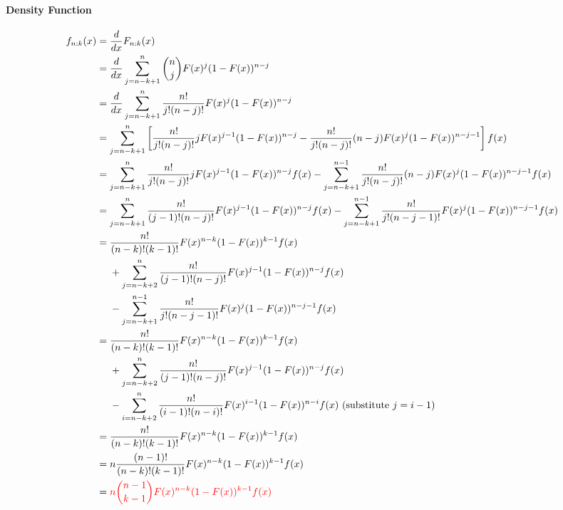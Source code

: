 \documentclass{article}
\begin{document}
	\paragraph{Density Function}
	\begin{align}
		f_{n:k}(x)
		&= \frac{d}{dx} F_{n:k}(x) \\
		&= \frac{d}{dx} \sum_{j=n-k+1}^n \binom{n}{j} F(x)^j (1 - F(x))^{n-j} \\
		&= \frac{d}{dx} \sum_{j=n-k+1}^n \frac{n!}{j!(n-j)!} F(x)^j (1 - F(x))^{n-j} \\
		&= \sum_{j=n-k+1}^n \left[
		\frac{n!}{j!(n-j)!} j F(x)^{j-1} (1 - F(x))^{n-j}
		- \frac{n!}{j!(n-j)!} (n-j) F(x)^j (1 - F(x))^{n-j-1}
		\right]f(x)\\
		&= \sum_{j=n-k+1}^n 
		\frac{n!}{j!(n-j)!} j F(x)^{j-1} (1 - F(x))^{n-j} f(x)
		- \sum_{j=n-k+1}^{n-1} 
		\frac{n!}{j!(n-j)!} (n-j) F(x)^j (1 - F(x))^{n-j-1} f(x)\\
		&= \sum_{j=n-k+1}^n
		\frac{n!}{(j-1)!(n-j)!} F(x)^{j-1} (1 - F(x))^{n-j} f(x)
		- \sum_{j=n-k+1}^{n-1}
		\frac{n!}{j!(n-j-1)!} F(x)^j (1 - F(x))^{n-j-1} f(x) \\
		&=\begin{aligned}[t]
			&\frac{n!}{(n-k)!(k-1)!} F(x)^{n-k} (1 - F(x))^{k-1} f(x) \\
			&+ \sum_{j=n-k+2}^n
			\frac{n!}{(j-1)!(n-j)!} F(x)^{j-1} (1 - F(x))^{n-j} f(x) \\
			&- \sum_{j=n-k+1}^{n-1}
			\frac{n!}{j!(n-j-1)!} F(x)^j (1 - F(x))^{n-j-1} f(x)
		\end{aligned} \\
		&=\begin{aligned}[t]
			&\frac{n!}{(n-k)!(k-1)!} F(x)^{n-k} (1 - F(x))^{k-1} f(x) \\
			&+ \sum_{j=n-k+2}^n
			\frac{n!}{(j-1)!(n-j)!} F(x)^{j-1} (1 - F(x))^{n-j} f(x) \\
			&- \sum_{i=n-k+2}^{n}
			\frac{n!}{(i-1)!(n-i)!} F(x)^{i-1} (1 - F(x))^{n-i} f(x) \text{ (substitute $j = i - 1$)}
		\end{aligned} \\
		&= \frac{n!}{(n-k)!(k-1)!} F(x)^{n-k} (1 - F(x))^{k-1} f(x) \\
		&= n \frac{(n-1)!}{(n-k)!(k-1)!} F(x)^{n-k} (1 - F(x))^{k-1} f(x) \\
		&= \textcolor{red}{
		n \binom{n-1}{k-1} F(x)^{n-k} (1 - F(x))^{k-1} f(x)
		}
	\end{align}
\end{document}
